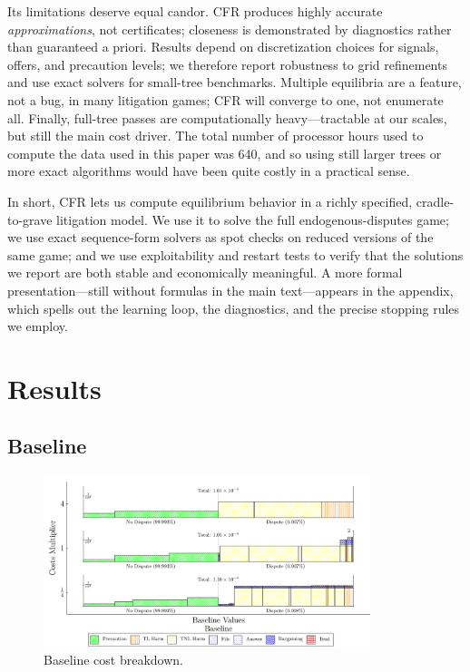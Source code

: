 \documentclass{article}
\begin{document}
Its limitations deserve equal candor. CFR produces highly accurate \emph{approximations}, not certificates; closeness is demonstrated by diagnostics rather than guaranteed a priori. Results depend on discretization choices for signals, offers, and precaution levels; we therefore report robustness to grid refinements and use exact solvers for small-tree benchmarks. Multiple equilibria are a feature, not a bug, in many litigation games; CFR will converge to one, not enumerate all. Finally, full-tree passes are computationally heavy—tractable at our scales, but still the main cost driver. The total number of processor hours used to compute the data used in this paper was 640, and so using still larger trees or more exact algorithms would have been quite costly in a practical sense.

In short, CFR lets us compute equilibrium behavior in a richly specified, cradle-to-grave litigation model. We use it to solve the full endogenous-disputes game; we use exact sequence-form solvers as spot checks on reduced versions of the same game; and we use exploitability and restart tests to verify that the solutions we report are both stable and economically meaningful. A more formal presentation—still without formulas in the main text—appears in the appendix, which spells out the learning loop, the diagnostics, and the precise stopping rules we employ.

\section{Results}

\subsection{Baseline}

\begin{figure}[ht]
  \centering
  \includegraphics[width=0.85\textwidth]{../Figures/Cost Breakdown Baseline (All Rows).pdf}
  \caption{Baseline cost breakdown.}
  \label{fig:baseline_costs}
\end{figure}
\end{document}

